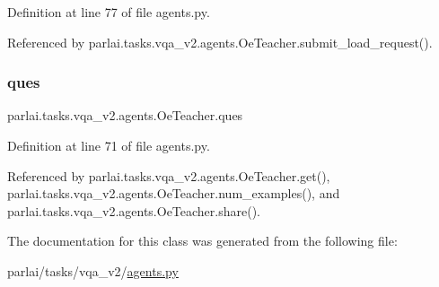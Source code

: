 Definition at line 77 of file agents.\+py.



Referenced by parlai.\+tasks.\+vqa\+\_\+v2.\+agents.\+Oe\+Teacher.\+submit\+\_\+load\+\_\+request().

\mbox{\label{classparlai_1_1tasks_1_1vqa__v2_1_1agents_1_1OeTeacher_a97e56f91309795ad390573355585a2f3}} 
\subsubsection{\texorpdfstring{ques}{ques}}
{\footnotesize\ttfamily parlai.\+tasks.\+vqa\+\_\+v2.\+agents.\+Oe\+Teacher.\+ques}



Definition at line 71 of file agents.\+py.



Referenced by parlai.\+tasks.\+vqa\+\_\+v2.\+agents.\+Oe\+Teacher.\+get(), parlai.\+tasks.\+vqa\+\_\+v2.\+agents.\+Oe\+Teacher.\+num\+\_\+examples(), and parlai.\+tasks.\+vqa\+\_\+v2.\+agents.\+Oe\+Teacher.\+share().



The documentation for this class was generated from the following file\+:\begin{DoxyCompactItemize}
\item 
parlai/tasks/vqa\+\_\+v2/\hyperlink{parlai_2tasks_2vqa__v2_2agents_8py}{agents.\+py}\end{DoxyCompactItemize}
